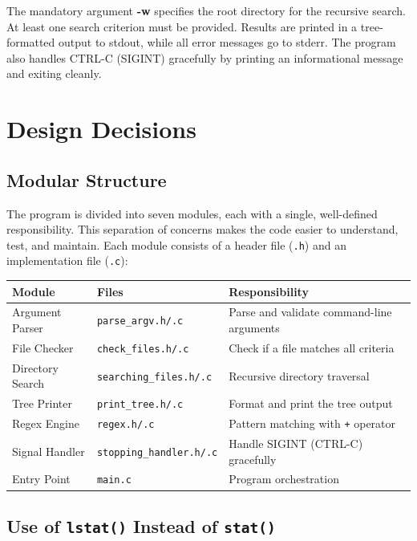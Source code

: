 \documentclass[12pt, a4paper]{article}
\begin{document}
The mandatory argument \textbf{-w} specifies the root directory for the recursive search.
At least one search criterion must be provided. Results are printed in a tree-formatted
output to stdout, while all error messages go to stderr. The program also handles
CTRL-C (SIGINT) gracefully by printing an informational message and exiting cleanly.

\section{Design Decisions}

\subsection{Modular Structure}

The program is divided into seven modules, each with a single, well-defined responsibility.
This separation of concerns makes the code easier to understand, test, and maintain.
Each module consists of a header file (\texttt{.h}) and an implementation file (\texttt{.c}):

\begin{center}
\begin{tabular}{lll}
\toprule
\textbf{Module} & \textbf{Files} & \textbf{Responsibility} \\
\midrule
Argument Parser  & \texttt{parse\_argv.h/.c}      & Parse and validate command-line arguments \\
File Checker     & \texttt{check\_files.h/.c}     & Check if a file matches all criteria \\
Directory Search & \texttt{searching\_files.h/.c} & Recursive directory traversal \\
Tree Printer     & \texttt{print\_tree.h/.c}      & Format and print the tree output \\
Regex Engine     & \texttt{regex.h/.c}            & Pattern matching with \texttt{+} operator \\
Signal Handler   & \texttt{stopping\_handler.h/.c}& Handle SIGINT (CTRL-C) gracefully \\
Entry Point      & \texttt{main.c}                & Program orchestration \\
\bottomrule
\end{tabular}
\end{center}

\subsection{Use of \texttt{lstat()} Instead of \texttt{stat()}}
\end{document}
